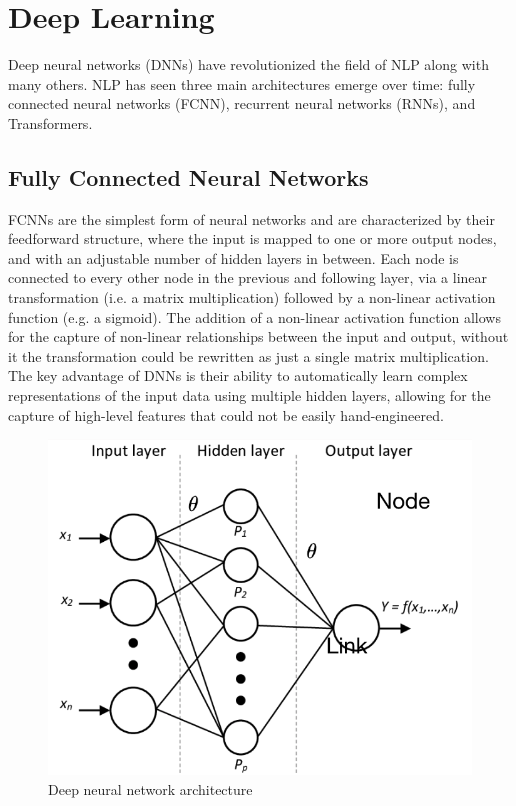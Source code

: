 \section{Deep Learning}
Deep neural networks (DNNs) have revolutionized the field of NLP along with many others. NLP has seen three main architectures emerge over time: fully connected neural networks (FCNN), recurrent neural networks (RNNs), and Transformers.

\subsection{Fully Connected Neural Networks}
FCNNs are the simplest form of neural networks and are characterized by their feedforward structure, where the input is mapped to one or more output nodes, and with an adjustable number of hidden layers in between.
Each node is connected to every other node in the previous and following layer, via a linear transformation (i.e. a matrix multiplication) followed by a non-linear activation function (e.g. a sigmoid).
The addition of a non-linear activation function allows for the capture of non-linear relationships between the input and output, without it the transformation could be rewritten as just a single matrix multiplication.
The key advantage of DNNs is their ability to automatically learn complex representations of the input data using multiple hidden layers, allowing for the capture of high-level features that could not be easily hand-engineered.

\begin{figure}[h]
    \includegraphics[width=\linewidth]{chapters/NLP/figures/model_architecture.png}
    \caption{Deep neural network architecture}
    \label{fig:model_architecture}
\end{figure}

